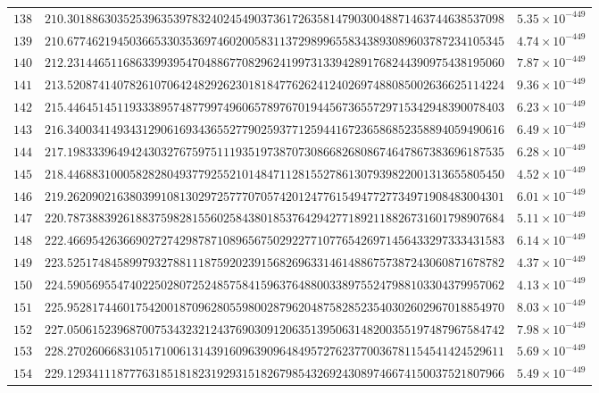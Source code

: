 \documentclass[12pt,reqno]{amsart}
\theoremstyle{remark}
\begin{document}
\begin{longtable}{clc}
$138$ & $210.3018863035253963539783240245490373617263581479030048871463744638537098$ & $5.35\times 10^{-449}$ \\
$139$ & $210.6774621945036653303536974602005831137298996558343893089603787234105345$ & $4.74\times 10^{-449}$ \\
$140$ & $212.2314465116863399395470488677082962419973133942891768244390975438195060$ & $7.87\times 10^{-449}$ \\
$141$ & $213.5208741407826107064248292623018184776262412402697488085002636625114224$ & $9.36\times 10^{-449}$ \\
$142$ & $215.4464514511933389574877997496065789767019445673655729715342948390078403$ & $6.23\times 10^{-449}$ \\
$143$ & $216.3400341493431290616934365527790259377125944167236586852358894059490616$ & $6.49\times 10^{-449}$ \\
$144$ & $217.1983339649424303276759751119351973870730866826808674647867383696187535$ & $6.28\times 10^{-449}$ \\
$145$ & $218.4468831000582828049377925521014847112815527861307939822001313655805450$ & $4.52\times 10^{-449}$ \\
$146$ & $219.2620902163803991081302972577707057420124776154947727734971908483004301$ & $6.01\times 10^{-449}$ \\
$147$ & $220.7873883926188375982815560258438018537642942771892118826731601798907684$ & $5.11\times 10^{-449}$ \\
$148$ & $222.4669542636690272742987871089656750292277107765426971456433297333431583$ & $6.14\times 10^{-449}$ \\
$149$ & $223.5251748458997932788111875920239156826963314614886757387243060871678782$ & $4.37\times 10^{-449}$ \\
$150$ & $224.5905695547402250280725248575841596376488003389755247988103304379957062$ & $4.13\times 10^{-449}$ \\
$151$ & $225.9528174460175420018709628055980028796204875828523540302602967018854970$ & $8.03\times 10^{-449}$ \\
$152$ & $227.0506152396870075343232124376903091206351395063148200355197487967584742$ & $7.98\times 10^{-449}$ \\
$153$ & $228.2702606683105171006131439160963909648495727623770036781154541424529611$ & $5.69\times 10^{-449}$ \\
$154$ & $229.1293411187776318518182319293151826798543269243089746674150037521807966$ & $5.49\times 10^{-449}$ \\

\end{longtable}
\end{document}
